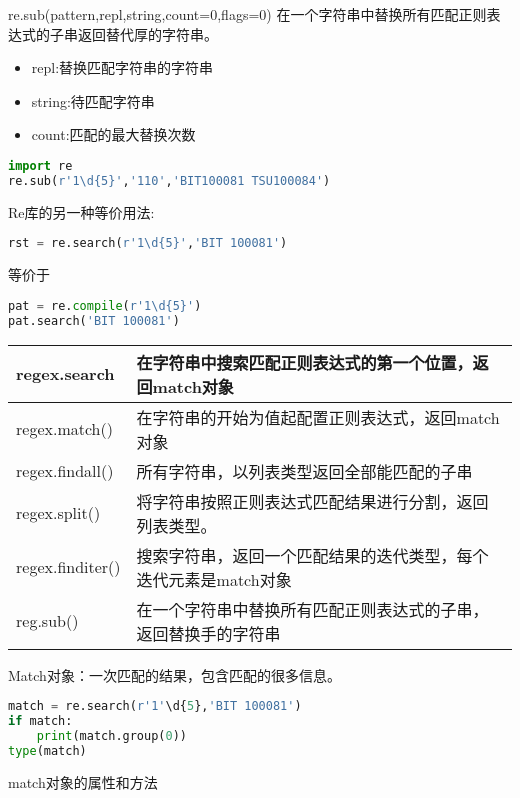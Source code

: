 re.sub(pattern,repl,string,count=0,flags=0)
在一个字符串中替换所有匹配正则表达式的子串返回替代厚的字符串。
\begin{itemize}
\item repl:替换匹配字符串的字符串
\item string:待匹配字符串
\item count:匹配的最大替换次数
\end{itemize}
\begin{lstlisting}[language=Python]
import re
re.sub(r'1\d{5}','110','BIT100081 TSU100084')
\end{lstlisting}
Re库的另一种等价用法:
\begin{lstlisting}[language=Python]
rst = re.search(r'1\d{5}','BIT 100081')
\end{lstlisting}
等价于
\begin{lstlisting}[language=Python]
pat = re.compile(r'1\d{5}')
pat.search('BIT 100081')
\end{lstlisting}
\begin{center}
	\begin{tabular}{|p{3cm}|p{7cm}|}
\hline
regex.search&在字符串中搜索匹配正则表达式的第一个位置，返回match对象\\
\hline
regex.match()&在字符串的开始为值起配置正则表达式，返回match对象\\
\hline
regex.findall()&所有字符串，以列表类型返回全部能匹配的子串\\
\hline
regex.split()&将字符串按照正则表达式匹配结果进行分割，返回列表类型。\\
\hline
regex.finditer()&搜索字符串，返回一个匹配结果的迭代类型，每个迭代元素是match对象\\
\hline
reg.sub()&在一个字符串中替换所有匹配正则表达式的子串，返回替换手的字符串\\
\hline
\end{tabular}
\end{center}
Match对象：一次匹配的结果，包含匹配的很多信息。
\begin{lstlisting}[language=Python]
match = re.search(r'1'\d{5},'BIT 100081')
if match:
    print(match.group(0))
type(match)
\end{lstlisting}
match对象的属性和方法

